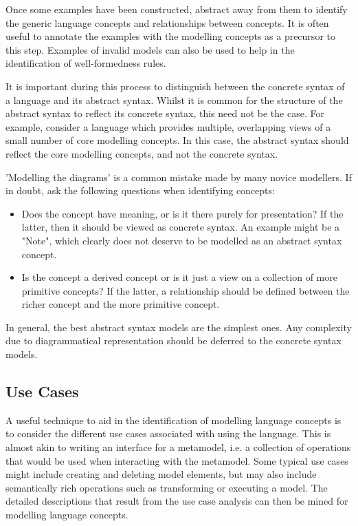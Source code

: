 Once some examples have been constructed, abstract away from them
to identify the generic language concepts and relationships between
concepts. It is often useful to annotate the examples with the
modelling concepts as a precursor to this step. Examples of invalid
models can also be used to help in the identification of
well-formedness rules.

It is important during this process to distinguish between the
concrete syntax of a language and its abstract syntax. Whilst it is
common for the structure of the abstract syntax to reflect its
concrete syntax, this need not be the case. For example, consider a
language which provides multiple, overlapping views of a small
number of core modelling concepts. In this case, the abstract
syntax should reflect the core modelling concepts, and not the
concrete syntax.

'Modelling the diagrams' is a common mistake made by many novice
modellers. If in doubt, ask the following questions when
identifying concepts:

\begin{itemize}
\item Does the concept have meaning, or is it there purely for
presentation? If the latter, then it should be viewed as concrete
syntax. An example might be a "Note", which clearly does not
deserve to be modelled as an abstract syntax concept.
\item Is the concept a derived concept or is it just a view
on a collection of more primitive concepts? If the latter, a
relationship should be defined between the richer concept and the
more primitive concept.
\end{itemize}

In general, the best abstract syntax models are the simplest ones.
Any complexity due to diagrammatical representation should be
deferred to the concrete syntax models.

\subsection{Use Cases}

A useful technique to aid in the identification of modelling
language concepts is to consider the different use cases
associated with using the language. This is almost akin to writing
an interface for a metamodel, i.e. a collection of operations that
would be used when interacting with the metamodel. Some typical
use cases might include creating and deleting model elements, but
may also include semantically rich operations such as transforming
or executing a model. The detailed descriptions that result from
the use case analysis can then be mined for modelling language
concepts.

